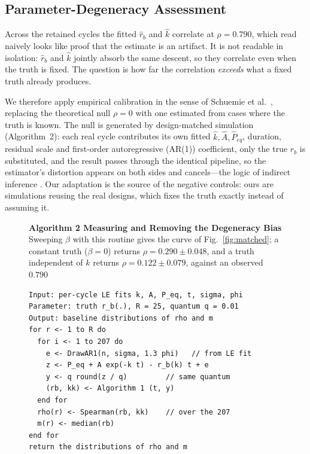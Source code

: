 \documentclass[runningheads]{llncs}
\newcommand{\rb}{\ensuremath{r_{b}}}
\newcommand{\rbh}{\ensuremath{\hat{r}_{b}}}
\newcommand{\kh}{\ensuremath{\hat{k}}}
\begin{document}
\subsection{Parameter-Degeneracy Assessment}

Across the retained cycles the fitted \rbh{} and \kh{} correlate at
$\rho=0.790$, which read naively looks like proof that the estimate is
an artifact. It is not readable in isolation: \rbh{} and \kh{} jointly
absorb the same descent, so they correlate even when the truth is
fixed. The question is how far the correlation \emph{exceeds} what a
fixed truth already produces.

We therefore apply empirical calibration in the sense of Schuemie et
al.~\cite{schuemie2014interpreting}, replacing the theoretical null
$\rho=0$ with one estimated from cases where the truth is known. The
null is generated by design-matched simulation (Algorithm~2): each real
cycle contributes its own fitted $\kh,\hat{A},\hat{P}_{eq}$, duration,
residual scale and first-order autoregressive
(AR(1)) coefficient, only the true \rb{} is
substituted, and the result passes through the identical pipeline, so
the estimator's distortion appears on both sides and cancels---the
logic of indirect inference \cite{gourieroux1993indirect}. Our adaptation is the source of the negative controls: ours are
simulations reusing the real designs, which fixes the truth exactly
instead of assuming it.

\begin{figure}[t]
\noindent\textbf{Algorithm 2  Measuring and Removing the Degeneracy Bias} Sweeping
$\beta$ with this routine gives the curve of Fig.~\ref{fig:matched};
a constant truth ($\beta=0$) returns $\rho=0.290\pm0.048$, and a truth
independent of $k$ returns $\rho=0.122\pm0.079$, against an observed
$0.790$

\begin{verbatim}
Input: per-cycle LE fits k, A, P_eq, t, sigma, phi
Parameter: truth r_b(.), R = 25, quantum q = 0.01
Output: baseline distributions of rho and m
for r <- 1 to R do
  for i <- 1 to 207 do
    e <- DrawAR1(n, sigma, 1.3 phi)   // from LE fit
    z <- P_eq + A exp(-k t) - r_b(k) t + e
    y <- q round(z / q)         // same quantum
    (rb, kk) <- Algorithm 1 (t, y)
  end for
  rho(r) <- Spearman(rb, kk)    // over the 207
  m(r) <- median(rb)
end for
return the distributions of rho and m
\end{verbatim}

\end{figure}
\end{document}
